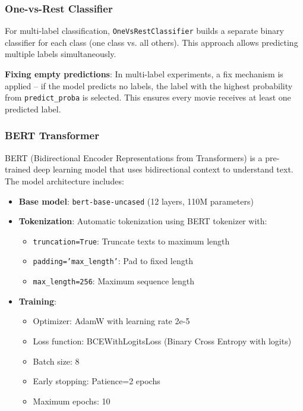 \documentclass[12pt,a4paper]{article}
\begin{document}
\subsubsection{One-vs-Rest Classifier}

For multi-label classification, \texttt{OneVsRestClassifier} builds a separate binary classifier for each class (one class vs. all others). This approach allows predicting multiple labels simultaneously.

\textbf{Fixing empty predictions}: In multi-label experiments, a fix mechanism is applied -- if the model predicts no labels, the label with the highest probability from \texttt{predict\_proba} is selected. This ensures every movie receives at least one predicted label.

\subsubsection{BERT Transformer}

BERT (Bidirectional Encoder Representations from Transformers) is a pre-trained deep learning model that uses bidirectional context to understand text. The model architecture includes:

\begin{itemize}
    \item \textbf{Base model}: \texttt{bert-base-uncased} (12 layers, 110M parameters)
    \item \textbf{Tokenization}: Automatic tokenization using BERT tokenizer with:
    \begin{itemize}
        \item \texttt{truncation=True}: Truncate texts to maximum length
        \item \texttt{padding='max\_length'}: Pad to fixed length
        \item \texttt{max\_length=256}: Maximum sequence length
    \end{itemize}
    \item \textbf{Training}:
    \begin{itemize}
        \item Optimizer: AdamW with learning rate 2e-5
        \item Loss function: BCEWithLogitsLoss (Binary Cross Entropy with logits)
        \item Batch size: 8
        \item Early stopping: Patience=2 epochs
        \item Maximum epochs: 10
    \end{itemize}
\end{itemize}
\end{document}
